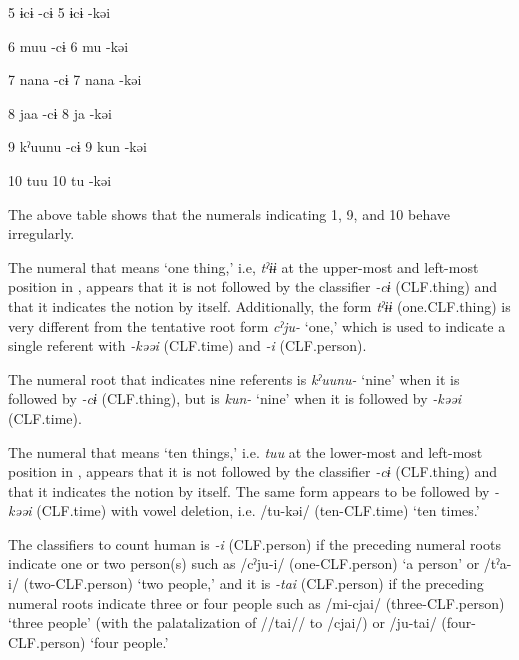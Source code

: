 5  ɨcɨ  {}-cɨ    5  ɨcɨ  {}-kəi        

6  muu  {}-cɨ    6  mu  {}-kəi        

7  nana  {}-cɨ    7  nana  {}-kəi        

8  jaa  {}-cɨ    8  ja  {}-kəi        

9  kˀuunu  {}-cɨ    9  kun  {}-kəi        

10  tuu      10  tu  {}-kəi        

\begin{styleBeschriftung}
\textmd{The above table shows that the numerals indicating 1, 9, and 10 behave irregularly.}
\end{styleBeschriftung}

\begin{styleBeschriftung}
\textmd{The numeral that means ‘one thing,’ i.e,} \textmd{\textit{tˀɨɨ}}\textmd{ at the upper-most and left-most position in , appears that it is not followed by the classifier} \textmd{\textit{{}-cɨ}}\textmd{ (CLF.thing) and} \textmd{that it indicates the notion by itself. Additionally, the form} \textmd{\textit{tˀɨɨ}}\textmd{ (one.CLF.thing) is very different from the tentative root form} \textmd{\textit{cˀju-}}\textmd{ ‘one,’ which is used to indicate a single referent with}\textmd{ \textit{-kəəi}}\textmd{ (CLF.time) and} \textmd{\textit{{}-i}}\textmd{ (CLF.person).}
\end{styleBeschriftung}

\begin{styleBeschriftung}
\textmd{The numeral root that indicates nine referents is} \textmd{\textit{kˀuunu-}}\textmd{ ‘nine’ when it is followed by} \textmd{\textit{{}-cɨ}}\textmd{ (CLF.thing), but is} \textmd{\textit{kun-}}\textmd{ ‘nine’ when it is followed by} \textmd{\textit{{}-kəəi}}\textmd{ (CLF.time).}
\end{styleBeschriftung}

  The numeral that means ‘ten things,’ i.e. \textit{tuu} at the lower-most and left-most position in , appears that it is not followed by the classifier \textit{{}-cɨ} (CLF.thing) and that it indicates the notion by itself. The same form appears to be followed by \textit{{}-kəəi} (CLF.time) with vowel deletion, i.e. /tu-kəi/ (ten-CLF.time) ‘ten times.’

  The classifiers to count human is \textit{{}-i} (CLF.person) if the preceding numeral roots indicate one or two person(s) such as /cˀju-i/ (one-CLF.person) ‘a person’ or /tˀa-i/ (two-CLF.person) ‘two people,’ and it is \textit{{}-tai} (CLF.person) if the preceding numeral roots indicate three or four people such as /mi-cjai/ (three-CLF.person) ‘three people’ (with the palatalization of //tai// to /cjai/) or /ju-tai/ (four-CLF.person) ‘four people.’

